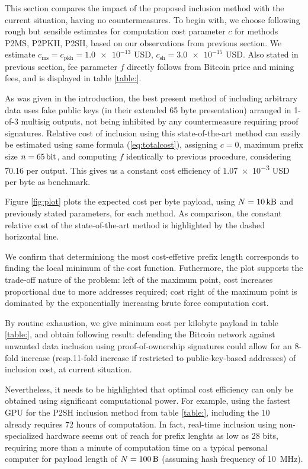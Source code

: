 \documentclass[10pt,a4paper,twocolumn]{article}
\begin{document}
This section compares the impact of the proposed inclusion method with the current situation, having no countermeasures.
To begin with, we choose following rough but sensible estimates for computation cost parameter $c$ for methods P2MS, P2PKH, P2SH, based on our observations from previous section.
We estimate $c_\text{ms}=c_\text{pkh}=\num{1.0e-13}$ USD, $c_\text{sh} = \num{3.0e-15}$ USD.
Also stated in previous section, fee parameter $f$ directly follows from Bitcoin price and mining fees, and is displayed in table \ref{table:}.

As was given in the introduction, the best present method of including arbitrary data uses fake public keys (in their extended 65 byte presentation) arranged in 1-of-3 multisig outputs, not being inhibited by any countermeasure requiring proof signatures.
Relative cost of inclusion using this state-of-the-art method can easily be estimated using same formula (\ref{eq:totalcost}), assigning $c=0$, maximum prefix size $n=\SI{65}{\bit}$, and computing $f$ identically to previous procedure, considering \SI{70.16}{\byte} per output.
This gives us a constant cost efficiency of \num{1.07e-3} USD per byte as benchmark.

Figure \ref{fig:plot} plots the expected cost per byte payload, using $N=\SI{10}{\kilo\byte}$ and previously stated parameters, for each method.
As comparison, the constant relative cost of the state-of-the-art method is highlighted by the dashed horizontal line. 

\enlargethispage{\baselineskip}
We confirm that determiniong the most cost-effetive prefix length corresponds to finding the local minimum of the cost function.
Futhermore, the plot supports the trade-off nature of the problem: left of the maximum point, cost increases proportional due to more addresses required; cost right of the maximum point is dominated by the exponentially increasing brute force computation cost.

By routine exhaustion, we give minimum cost per kilobyte payload in table \ref{table:},
and obtain following result: 
defending the Bitcoin network against unwanted data inclusion using proof-of-ownership signatures could allow for an 8-fold increase (resp.\@ 11-fold increase if restricted to public-key-based addresses) of inclusion cost, at current situation.

Nevertheless, it needs to be highlighted that optimal cost efficiency can only be obtained using significant computational power.
For example, using the fastest GPU for the P2SH inclusion method from table \ref{table:}, including the \SI{10}{\kilo\byte} already requires 72 hours of computation.
In fact, real-time inclusion using non-specialized hardware seems out of reach for prefix lenghts as low as 28 bits, requiring more than a minute of computation time on a typical personal computer for payload length of $N=\SI{100}{\byte}$ (assuming hash frequency of \SI{10}{\mega\hertz}).
\end{document}
